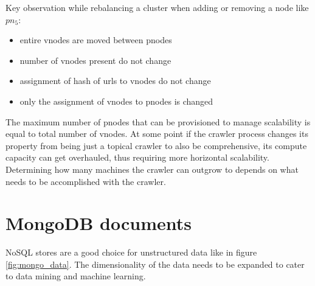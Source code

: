 \noindent
Key observation while rebalancing a cluster when adding or removing a node like $pn_5$:
\begin{itemize}
  \item entire vnodes are moved between pnodes
  \item number of vnodes present do not change 
  \item assignment of hash of urls to vnodes do not change
  \item only the assignment of vnodes to pnodes is changed
\end{itemize}

\noindent
The maximum number of pnodes that can be provisioned to manage scalability is equal to total number of
vnodes. At some point if the crawler process changes its property from being just a topical crawler to
also be comprehensive, its compute capacity can get overhauled, thus requiring more horizontal scalability.
Determining how many machines the crawler can outgrow to depends on what needs to be accomplished with the crawler.

\pagebreak

\section{MongoDB documents}
NoSQL stores are a good choice for unstructured data like in figure \ref{fig:mongo_data}. The
dimensionality of the data needs to be expanded to cater to data mining and machine learning.

